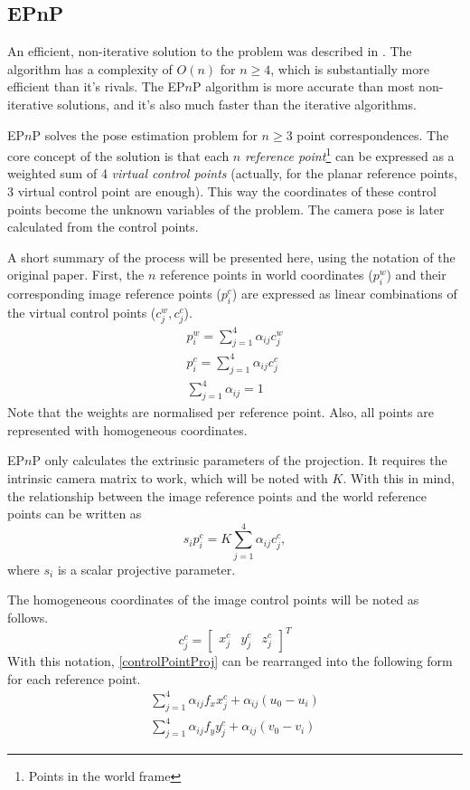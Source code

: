 \subsection{EPnP}

An efficient, non-iterative solution to the problem was described in \cite{Lepetit2008}.
The algorithm has a complexity of $O(n)$ for $n\geq4$, which is substantially more efficient than it's rivals.
The EP$n$P algorithm is more accurate than most non-iterative solutions, and it's also much faster than the iterative algorithms.

EP$n$P solves the pose estimation problem for $n\geq3$ point correspondences.
The core concept of the solution is that each $n$ \textit{reference point}\footnote{Points in the world frame} can be expressed as a weighted sum of 4 \textit{virtual control points}\cite{Lepetit2008} (actually, for the planar reference points, 3 virtual control point are enough).
This way the coordinates of these control points become the unknown variables of the problem.
The camera pose is later calculated from the control points.

A short summary of the process will be presented here, using the notation of the original paper\cite{Lepetit2008}.
First, the $n$ reference points in world coordinates ($p_i^w$) and their corresponding image reference points ($p_i^c$) are expressed as linear combinations of the virtual control points ($c_j^w, c_j^c$).
\begin{align}
	p_i^w = \sum_{j=1}^{4} \alpha_{ij} c_j^w \\ 
	p_i^c = \sum_{j=1}^{4} \alpha_{ij} c_j^c \\
	\sum_{j=1}^{4} \alpha_{ij} = 1
\end{align}
Note that the weights are normalised per reference point.
Also, all points are represented with homogeneous coordinates.

EP$n$P only calculates the extrinsic parameters of the projection.
It requires the intrinsic camera matrix to work, which will be noted with $K$.
With this in mind, the relationship between the image reference points and the world reference points can be written as
\begin{equation}
	s_i p_i^c = K \sum_{j=1}^{4} \alpha_{ij} c_j^c,
	\label{eq:controlPointProj}
\end{equation}
where $s_i$ is a scalar projective parameter.

The homogeneous coordinates of the image control points will be noted as follows.
\begin{equation}
	c_j^c = 
	\begin{bmatrix}
		x_j^c & y_j^c & z_j^c
	\end{bmatrix}^T
\end{equation}
With this notation, \eqref{controlPointProj} can be rearranged into the following form for each reference point.
\begin{align}
	\sum_{j=1}^{4} \alpha_{ij} f_x x_j^c + \alpha_{ij} (u_0 - u_i) \\
	\sum_{j=1}^{4} \alpha_{ij} f_y y_j^c + \alpha_{ij} (v_0 - v_i) 
\end{align}

